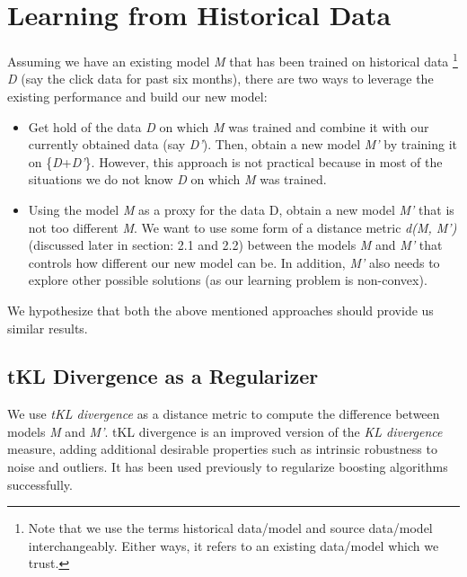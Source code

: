 \documentclass[a4paper]{article}
\begin{document}
\section{Learning from Historical Data}
Assuming we have an existing model \textit{M} that has been trained on historical data \footnote{Note that we use the terms historical data/model and source data/model interchangeably. Either ways, it refers to an existing data/model which we trust.} \textit{D} (say the click data for past six months), there are two ways to leverage the existing performance and build our new model:
\begin{itemize}
\item Get hold of the data \textit{D} on which \textit{M} was trained and combine it with our currently obtained data (say \textit{D’}). Then, obtain a new model \textit{M’} by training it on \{\textit{D}+\textit{D’}\}. However, this approach is not practical because in most of the situations we do not know \textit{D} on which \textit{M} was trained.
\item Using the model \textit{M} as a proxy for the data D, obtain a new model \textit{M’}  that is not too different \textit{M}. We want to use some form of a distance metric \textit{d(M, M')} (discussed later in section: 2.1 and 2.2) between the models \textit{M} and \textit{M’} that controls how different our new model can be. In addition, \textit{M'} also needs to explore other possible solutions (as our learning problem is non-convex).
\end{itemize}

\noindent We hypothesize that both the above mentioned approaches should provide us similar results.

\subsection{tKL Divergence as a Regularizer}
We use \textit{tKL divergence} \citep{liu2011total} as a distance metric to compute the difference between models \textit{M} and \textit{M'}. tKL divergence is an improved version of the \textit{KL divergence} measure, adding additional desirable properties such as intrinsic robustness to noise and outliers. It has been used previously \citep{Liu2011} to regularize boosting algorithms successfully.\\
\end{document}
